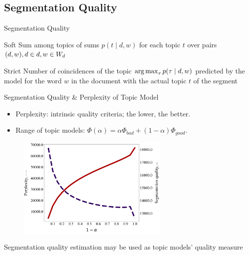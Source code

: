 \documentclass[russian]{beamer}
\begin{document}
\subsection{Segmentation Quality}

\begin{frame}{Segmentation Quality}
  \begin{block}{Soft}
    Sum among topics of sums $p(t \mid d, w)$ for each topic $t$ over pairs $(d, w), d \hm\in d, w \hm\in W_d$
  \end{block}
  
  \begin{block}{Strict}
    Number of coincidences of the topic $\operatorname*{arg\,max}_\tau p(\tau \mid d, w)$ predicted by the model for the word $w$ in the document with the actual topic $t$ of the segment
  \end{block}
\end{frame}


\begin{frame}{Segmentation Quality \& Perplexity of Topic Model}
  \begin{itemize}\setlength{\leftmargin}{0pt}
  \item Perplexity: intrinsic quality criteria; the lower, the better.
  \item Range of topic models: $\Phi(\alpha) = \alpha \Phi_{bad} + (1 - \alpha) \Phi_{good}$.
  \end{itemize}
  
  \begin{figure}[h]
    \centering
    \includegraphics[width=0.65\textwidth]{segm_quality-iteration200}
  \end{figure}
  
  \begin{block}{}
    Segmentation quality estimation may be used as topic models’ quality measure
  \end{block}
\end{frame}
\end{document}
